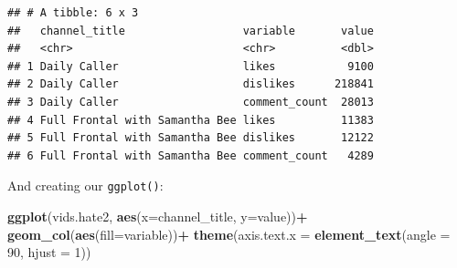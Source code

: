 \documentclass[]{article}
\newenvironment{Shaded}{\begin{snugshade}}{\end{snugshade}}
\newcommand{\DataTypeTok}[1]{\textcolor[rgb]{0.13,0.29,0.53}{#1}}
\newcommand{\DecValTok}[1]{\textcolor[rgb]{0.00,0.00,0.81}{#1}}
\newcommand{\KeywordTok}[1]{\textcolor[rgb]{0.13,0.29,0.53}{\textbf{#1}}}
\newcommand{\NormalTok}[1]{#1}
\newcommand{\OperatorTok}[1]{\textcolor[rgb]{0.81,0.36,0.00}{\textbf{#1}}}
\newcommand{\StringTok}[1]{\textcolor[rgb]{0.31,0.60,0.02}{#1}}
\begin{document}
\begin{Shaded}
\end{Shaded}

\begin{verbatim}
## # A tibble: 6 x 3
##   channel_title                  variable       value
##   <chr>                          <chr>          <dbl>
## 1 Daily Caller                   likes           9100
## 2 Daily Caller                   dislikes      218841
## 3 Daily Caller                   comment_count  28013
## 4 Full Frontal with Samantha Bee likes          11383
## 5 Full Frontal with Samantha Bee dislikes       12122
## 6 Full Frontal with Samantha Bee comment_count   4289
\end{verbatim}

And creating our \texttt{ggplot()}:

\begin{Shaded}
\begin{Highlighting}[]
\KeywordTok{ggplot}\NormalTok{(vids.hate2, }\KeywordTok{aes}\NormalTok{(}\DataTypeTok{x=}\NormalTok{channel_title, }\DataTypeTok{y=}\NormalTok{value))}\OperatorTok{+}
\StringTok{  }\KeywordTok{geom_col}\NormalTok{(}\KeywordTok{aes}\NormalTok{(}\DataTypeTok{fill=}\NormalTok{variable))}\OperatorTok{+}
\StringTok{  }\KeywordTok{theme}\NormalTok{(}\DataTypeTok{axis.text.x =} \KeywordTok{element_text}\NormalTok{(}\DataTypeTok{angle =} \DecValTok{90}\NormalTok{, }\DataTypeTok{hjust =} \DecValTok{1}\NormalTok{))}
\end{Highlighting}
\end{Shaded}
\end{document}

